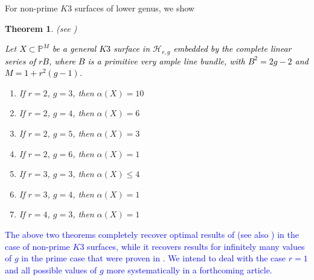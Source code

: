 \documentclass[11pt,twoside]{amsart}
\theoremstyle{plain}
\numberwithin{equation}{section}
\newtheorem{theorem}{Theorem}[section]
\newtheorem{corollary}[theorem]{Corollary}
\theoremstyle{definition}
\begin{document}


\color{black}


For non-prime $K3$ surfaces of lower genus, we show 

\begin{theorem}(see )\label{ZL for lower genus $K3$ surfaces intro}

Let \textcolor{black}{$X \subset \mathbb{P}^{M}$ be a general $K3$ surface in $\mathcal{H}_{r,g}$ embedded by the complete linear series of $rB$, where $B$ is a primitive very ample line bundle, with $B^2 = 2g-2$ and $M = 1+r^2(g-1)$.}

    \begin{enumerate}
        \item If $r = 2$, $g = 3$, then $\alpha(X) = 10$ 
        \item If $r = 2$, $g = 4$, then $\alpha(X) = 6$ 
        \item If $r = 2$, $g = 5$, then $\alpha(X) = 3$ 
        \item If $r = 2$, $g = 6$, then $\alpha(X) = 1$ 
        \item If $r = 3$, $g = 3$, then $\alpha(X) \leq 4$
        \item If $r = 3$, $g = 4$, then $\alpha(X) = 1$ 
        \item If $r = 4$, $g = 3$, then $\alpha(X) = 1$
        
       
        
    \end{enumerate}
    
\end{theorem}

\textcolor{blue}{The above two theorems completely recover optimal results of \cite{CLM98} (see also \cite{CLM98c}) in the case of non-prime $K3$ surfaces, while it recovers results for infinitely many values of $g$ in the prime case that were proven in \cite{CLM93}. We intend to deal with the case $r = 1$ and all possible values of $g$ more systematically in a forthcoming article. }
\end{document}
